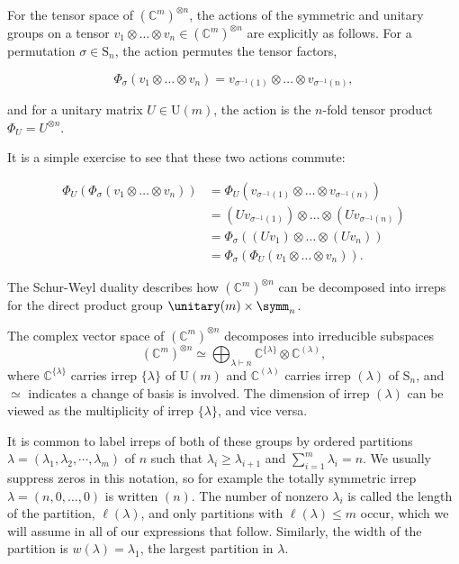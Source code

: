 For the tensor space of $(\mathbb{C}^{m})^{\otimes n}$, the actions of the symmetric and unitary groups on a tensor $v_1\otimes\dots\otimes v_n \in (\mathbb{C}^m)^{\otimes n}$ are explicitly as follows. 
For a permutation $\sigma \in \textrm{S}_n$, the action permutes the tensor factors,

\begin{equation}
\Phi_\sigma(v_1\otimes\dots\otimes v_n) = v_{\sigma^{-1}(1)}\otimes\dots\otimes v_{\sigma^{-1}(n)},
\end{equation}

\noindent and for a unitary matrix $U \in \textrm{U}(m)$, the action is the $n$-fold tensor product $\Phi_U = U^{\otimes n}$.

It is a simple exercise to see that these two actions commute:

\begin{align}
\Phi_U(\Phi_\sigma(v_1\otimes\dots\otimes v_n)) &= \Phi_U(v_{\sigma^{-1}(1)}\otimes\dots\otimes v_{\sigma^{-1}(n)})\\
&= (Uv_{\sigma^{-1}(1)})\otimes\dots\otimes(Uv_{\sigma^{-1}(n)})\\
&= \Phi_\sigma((Uv_1)\otimes\dots\otimes (Uv_n))\\
&= \Phi_\sigma(\Phi_U(v_1\otimes\dots\otimes v_n)).
\end{align}

The Schur-Weyl duality describes how $(\mathbb{C}^m)^{\otimes n}$ can be decomposed into irreps for the direct product group $\unitary(m)\times\symm_n$.

\begin{theorem}
The complex vector space of $(\mathbb{C}^m)^{\otimes n}$ decomposes into irreducible subspaces
\begin{equation}
(\mathbb{C}^m)^{\otimes n} \simeq \bigoplus_{\lambda\vdash n} \mathbb{C}^{\{\lambda\}} \otimes \mathbb{C}^{(\lambda)} ,
\end{equation}
where $\mathbb{C}^{\{\lambda\}}$ carries irrep $\{\lambda\}$ of $\textrm{U}(m)$ and $\mathbb{C}^{(\lambda)}$ carries irrep $(\lambda)$ of $\textrm{S}_n$, and $\simeq$ indicates a change of basis is involved.
The dimension of irrep $(\lambda)$ can be viewed as the multiplicity of irrep $\{\lambda\}$, and vice versa.
\end{theorem}

It is common to label irreps of both of these groups by ordered partitions $\lambda = (\lambda_1,\lambda_2,\cdots,\lambda_m)$ of $n$ such that $\lambda_i \geq \lambda_{i+1}$ and $\sum_{i = 1}^m \lambda_i = n$.
We usually suppress zeros in this notation, so for example the totally symmetric irrep $\lambda=(n, 0,\dots,0)$ is written $(n)$. 
The number of nonzero $\lambda_i$ is called the length of the partition, $\ell(\lambda)$, and only partitions with $\ell(\lambda) \leq m$ occur, which we will assume in all of our expressions that follow. Similarly, the width of the partition is $w(\lambda) = \lambda_1$, the largest partition in $\lambda$.

